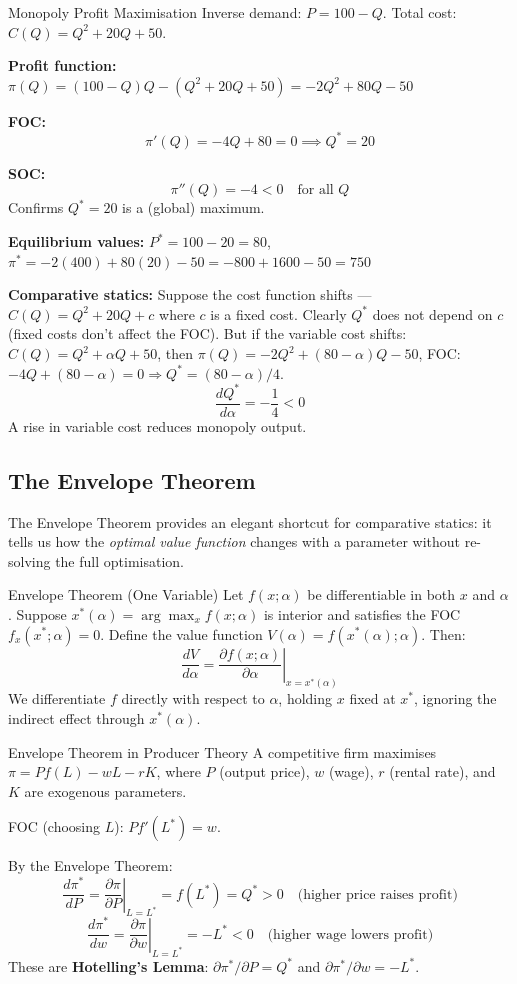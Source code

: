 \documentclass[12pt, a4paper]{article}
\theoremstyle{definition}
\newcommand{\ddd}[2]{\dfrac{d#1}{d#2}}
\newcommand{\pp}[2]{\dfrac{\partial #1}{\partial #2}}
\newcommand{\eval}[2]{\left.#1\right|_{#2}}
\begin{document}
\begin{exbox}{Monopoly Profit Maximisation}
Inverse demand: $P = 100 - Q$.
Total cost: $C(Q) = Q^2 + 20Q + 50$.

\textbf{Profit function:}
$\pi(Q) = (100-Q)Q - (Q^2+20Q+50) = -2Q^2 + 80Q - 50$

\textbf{FOC:}
\[
  \pi'(Q) = -4Q + 80 = 0 \implies Q^* = 20
\]

\textbf{SOC:}
\[
  \pi''(Q) = -4 < 0 \quad\text{for all }Q
\]
Confirms $Q^* = 20$ is a (global) maximum.

\textbf{Equilibrium values:}
$P^* = 100 - 20 = 80$,\quad
$\pi^* = -2(400) + 80(20) - 50 = -800 + 1600 - 50 = 750$

\textbf{Comparative statics:} Suppose the cost function shifts ---
$C(Q) = Q^2 + 20Q + c$ where $c$ is a fixed cost.  Clearly $Q^*$ does
not depend on $c$ (fixed costs don't affect the FOC).  But if the
variable cost shifts: $C(Q) = Q^2 + \alpha Q + 50$, then
$\pi(Q) = -2Q^2 + (80-\alpha)Q - 50$,
FOC: $-4Q + (80-\alpha) = 0 \Rightarrow Q^* = (80-\alpha)/4$.
\[
  \ddd{Q^*}{\alpha} = -\frac{1}{4} < 0
\]
A rise in variable cost reduces monopoly output.
\end{exbox}

\subsection{The Envelope Theorem}

The Envelope Theorem provides an elegant shortcut for comparative statics: it
tells us how the \emph{optimal value function} changes with a parameter without
re-solving the full optimisation.

\begin{thmbox}{Envelope Theorem (One Variable)}
Let $f(x;\alpha)$ be differentiable in both $x$ and $\alpha$.  Suppose
$x^*(\alpha) = \arg\max_x f(x;\alpha)$ is interior and satisfies the FOC
$f_x(x^*;\alpha) = 0$.  Define the value function
$V(\alpha) = f(x^*(\alpha);\alpha)$.  Then:
\[
  \ddd{V}{\alpha}
  = \left.\pp{f(x;\alpha)}{\alpha}\right|_{x=x^*(\alpha)}
\]
We differentiate $f$ directly with respect to $\alpha$, holding $x$ fixed at
$x^*$, ignoring the indirect effect through $x^*(\alpha)$.
\end{thmbox}

\begin{exbox}{Envelope Theorem in Producer Theory}
A competitive firm maximises $\pi = Pf(L) - wL - rK$, where $P$ (output
price), $w$ (wage), $r$ (rental rate), and $K$ are exogenous parameters.

FOC (choosing $L$): $Pf'(L^*) = w$.

By the Envelope Theorem:
\[
  \ddd{\pi^*}{P} = \eval{\pp{\pi}{P}}{L=L^*} = f(L^*) = Q^* > 0
  \quad\text{(higher price raises profit)}
\]
\[
  \ddd{\pi^*}{w} = \eval{\pp{\pi}{w}}{L=L^*} = -L^* < 0
  \quad\text{(higher wage lowers profit)}
\]
These are \textbf{Hotelling's Lemma}: $\partial\pi^*/\partial P = Q^*$
and $\partial\pi^*/\partial w = -L^*$.
\end{exbox}
\end{document}
